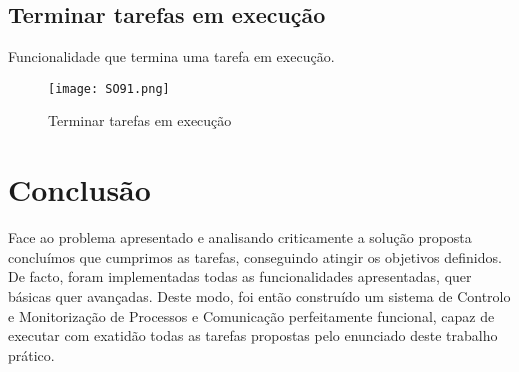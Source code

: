 \documentclass[a4paper]{article}
\begin{document}
\subsection{\textbf{Terminar tarefas em execução}}
Funcionalidade que termina uma tarefa em execução.
\begin{figure}[H]
\centering
\texttt{[image: SO91.png]}
\caption{Terminar tarefas em execução}
\label{img: Terminar tarefas em execução}
\end{figure}

\pagebreak

\section{Conclusão}
\label{sec:conclusao}
Face ao problema apresentado e analisando criticamente a solução proposta
concluímos que cumprimos as tarefas, conseguindo atingir os objetivos definidos.
De facto, foram implementadas todas as funcionalidades apresentadas, quer
básicas quer avançadas.
Deste modo, foi então construído um sistema de Controlo e Monitorização de Processos e Comunicação
perfeitamente funcional, capaz de executar com exatidão todas as tarefas propostas pelo enunciado deste trabalho prático. 
\end{document}
